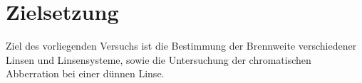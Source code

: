 \section{Zielsetzung}
\label{sec:Zielsetzung}
Ziel des vorliegenden Versuchs ist die Bestimmung der Brennweite verschiedener Linsen und Linsensysteme, sowie die Untersuchung der chromatischen Abberration bei einer dünnen Linse.
